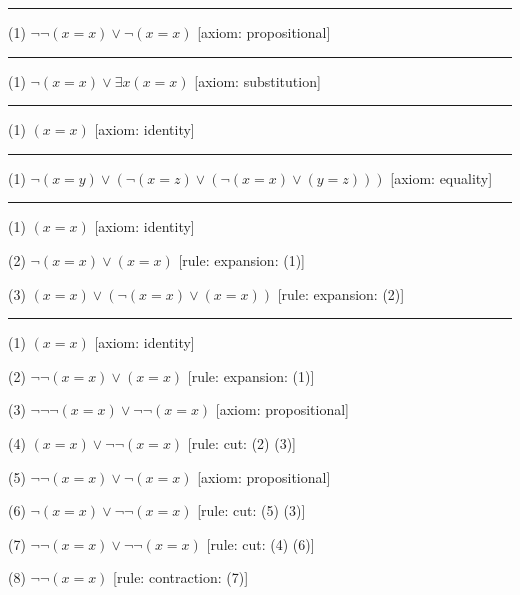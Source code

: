 
\medskip
\hrule
\medskip
\item{(1)} $\neg \neg (x = x) \lor \neg (x = x)$ \hfill [axiom: propositional]
\medskip
\hrule
\medskip
\item{(1)} $\neg (x = x) \lor \exists x (x = x)$ \hfill [axiom: substitution]
\medskip
\hrule
\medskip
\item{(1)} $(x = x)$ \hfill [axiom: identity]
\medskip
\hrule
\medskip
\item{(1)} $\neg (x = y) \lor (\neg (x = z) \lor (\neg (x = x) \lor (y = z)))$ \hfill [axiom: equality]
\medskip
\hrule
\medskip
\item{(1)} $(x = x)$ \hfill [axiom: identity]
\item{(2)} $\neg (x = x) \lor (x = x)$ \hfill [rule: expansion: (1)]
\item{(3)} $(x = x) \lor (\neg (x = x) \lor (x = x))$ \hfill [rule: expansion: (2)]
\medskip
\hrule
\medskip
\item{(1)} $(x = x)$ \hfill [axiom: identity]
\item{(2)} $\neg \neg (x = x) \lor (x = x)$ \hfill [rule: expansion: (1)]
\item{(3)} $\neg \neg \neg (x = x) \lor \neg \neg (x = x)$ \hfill [axiom: propositional]
\item{(4)} $(x = x) \lor \neg \neg (x = x)$ \hfill [rule: cut: (2) (3)]
\item{(5)} $\neg \neg (x = x) \lor \neg (x = x)$ \hfill [axiom: propositional]
\item{(6)} $\neg (x = x) \lor \neg \neg (x = x)$ \hfill [rule: cut: (5) (3)]
\item{(7)} $\neg \neg (x = x) \lor \neg \neg (x = x)$ \hfill [rule: cut: (4) (6)]
\item{(8)} $\neg \neg (x = x)$ \hfill [rule: contraction: (7)]
